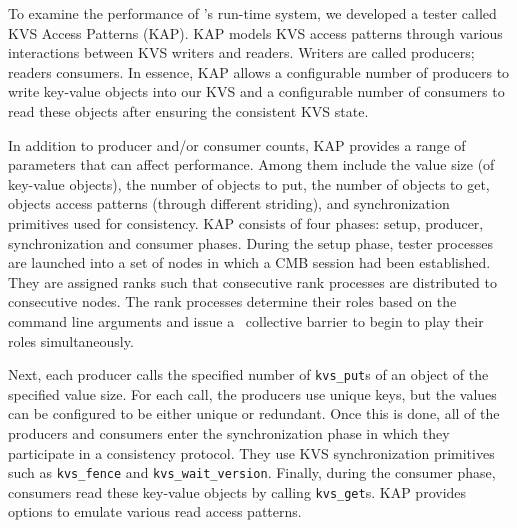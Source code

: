 To examine the performance of \flux's run-time system,
we developed a tester called KVS Access Patterns (KAP).
KAP models KVS access patterns through various interactions
between KVS writers and readers. Writers are called producers;
readers consumers.
In essence, KAP allows a configurable number of producers
to write key-value objects into our KVS 
and a configurable number of consumers to read these
objects after ensuring the consistent KVS state.

In addition to producer and/or consumer counts,
KAP provides a range of parameters that can affect performance.
Among them include the value size (of key-value objects),
the number of objects to put,
the number of objects to get, objects access 
patterns (through different striding), and
synchronization primitives used for consistency.
KAP consists of four phases: setup, producer, synchronization 
and consumer phases. 
During the setup phase, tester processes are launched 
into a set of nodes in which a CMB session had been established.
They are assigned ranks such that consecutive rank
processes are distributed to consecutive nodes.
The rank processes determine their roles based
on the command line arguments and issue a
\flux\ collective barrier to begin to play their roles
simultaneously.

Next, each producer calls the specified number of
{\tt kvs\_put}s of an object of the specified value size.
For each call, the producers use unique keys, but
the values can be configured to be either unique
or redundant.
Once this is done, all of the producers and consumers
enter the synchronization phase in which they 
participate in a consistency protocol. They use
KVS synchronization primitives such as {\tt kvs\_fence}
and {\tt kvs\_wait\_version}.
Finally, during the consumer phase, consumers read
these key-value objects by calling {\tt kvs\_get}s.
KAP provides options to emulate various read access
patterns.

